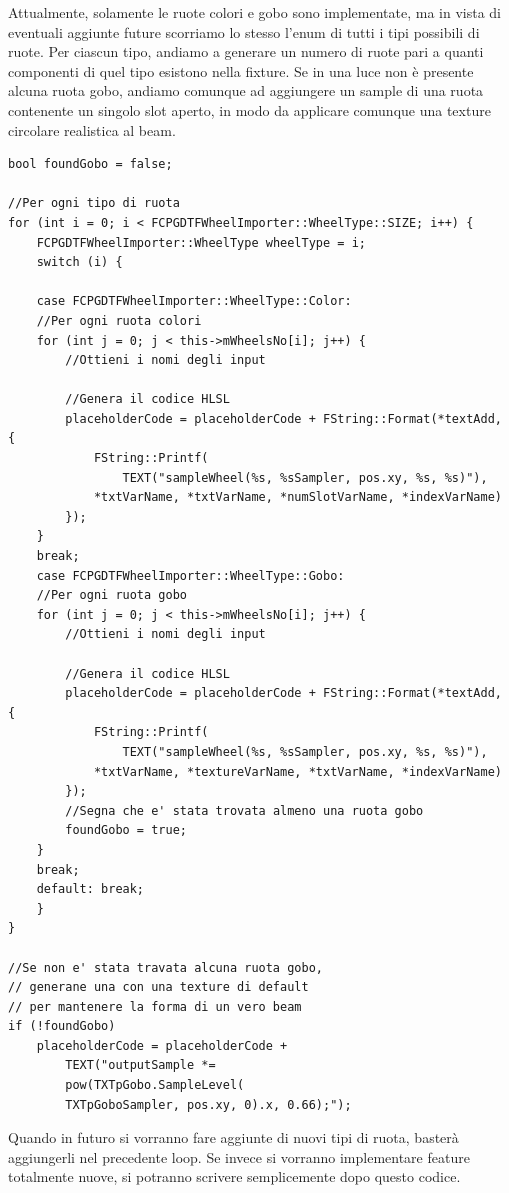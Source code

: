 \documentclass[main.tex]{subfiles}
\begin{document}
Attualmente, solamente le ruote colori e gobo sono implementate, ma in vista di eventuali aggiunte future scorriamo lo stesso l'enum di tutti i tipi possibili di ruote. Per ciascun tipo, andiamo a generare un numero di ruote pari a quanti componenti di quel tipo esistono nella fixture. Se in una luce non è presente alcuna ruota gobo, andiamo comunque ad aggiungere un sample di una ruota contenente un singolo slot aperto, in modo da applicare comunque una texture circolare realistica al beam.
\begin{lstlisting}
bool foundGobo = false;

//Per ogni tipo di ruota
for (int i = 0; i < FCPGDTFWheelImporter::WheelType::SIZE; i++) {
    FCPGDTFWheelImporter::WheelType wheelType = i;
    switch (i) {
    
    case FCPGDTFWheelImporter::WheelType::Color:
    //Per ogni ruota colori
    for (int j = 0; j < this->mWheelsNo[i]; j++) {
        //Ottieni i nomi degli input

        //Genera il codice HLSL
        placeholderCode = placeholderCode + FString::Format(*textAdd, {
            FString::Printf(
                TEXT("sampleWheel(%s, %sSampler, pos.xy, %s, %s)"),
            *txtVarName, *txtVarName, *numSlotVarName, *indexVarName)
        });
    }
    break;
    case FCPGDTFWheelImporter::WheelType::Gobo:
    //Per ogni ruota gobo
    for (int j = 0; j < this->mWheelsNo[i]; j++) {
        //Ottieni i nomi degli input
        
        //Genera il codice HLSL
        placeholderCode = placeholderCode + FString::Format(*textAdd, {
            FString::Printf(
                TEXT("sampleWheel(%s, %sSampler, pos.xy, %s, %s)"),
            *txtVarName, *textureVarName, *txtVarName, *indexVarName)
        });
        //Segna che e' stata trovata almeno una ruota gobo
        foundGobo = true;
    }
    break;
    default: break;
    }
}

//Se non e' stata travata alcuna ruota gobo,
// generane una con una texture di default
// per mantenere la forma di un vero beam
if (!foundGobo)
    placeholderCode = placeholderCode +
        TEXT("outputSample *=
        pow(TXTpGobo.SampleLevel(
        TXTpGoboSampler, pos.xy, 0).x, 0.66);");

\end{lstlisting}
Quando in futuro si vorranno fare aggiunte di nuovi tipi di ruota, basterà aggiungerli nel precedente loop. Se invece si vorranno implementare feature totalmente nuove, si potranno scrivere semplicemente dopo questo codice.\newline
\end{document}
